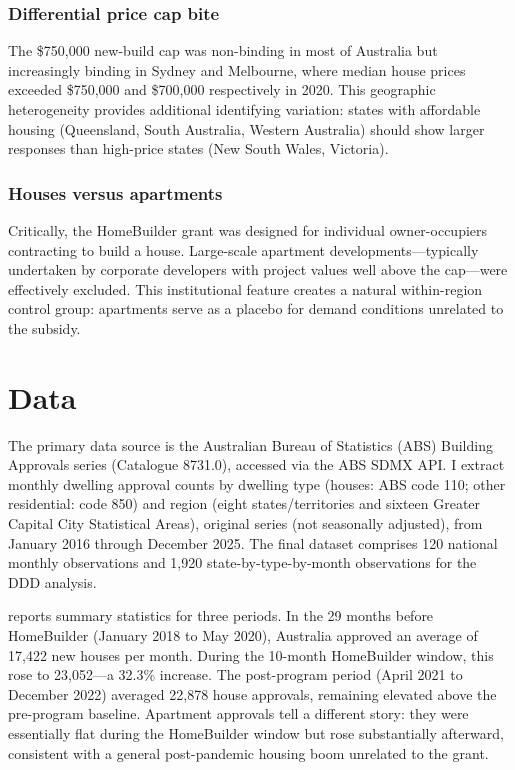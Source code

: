 \documentclass[12pt]{article}
\begin{document}
\subsubsection*{Differential price cap bite} The \$750,000 new-build cap was non-binding in most of Australia but increasingly binding in Sydney and Melbourne, where median house prices exceeded \$750,000 and \$700,000 respectively in 2020. This geographic heterogeneity provides additional identifying variation: states with affordable housing (Queensland, South Australia, Western Australia) should show larger responses than high-price states (New South Wales, Victoria).

\subsubsection*{Houses versus apartments} Critically, the HomeBuilder grant was designed for individual owner-occupiers contracting to build a house. Large-scale apartment developments---typically undertaken by corporate developers with project values well above the cap---were effectively excluded. This institutional feature creates a natural within-region control group: apartments serve as a placebo for demand conditions unrelated to the subsidy.


\section{Data}
\label{sec:data}

The primary data source is the Australian Bureau of Statistics (ABS) Building Approvals series (Catalogue 8731.0), accessed via the ABS SDMX API. I extract monthly dwelling approval counts by dwelling type (houses: ABS code 110; other residential: code 850) and region (eight states/territories and sixteen Greater Capital City Statistical Areas), original series (not seasonally adjusted), from January 2016 through December 2025. The final dataset comprises 120 national monthly observations and 1,920 state-by-type-by-month observations for the DDD analysis.



 reports summary statistics for three periods. In the 29 months before HomeBuilder (January 2018 to May 2020), Australia approved an average of 17,422 new houses per month. During the 10-month HomeBuilder window, this rose to 23,052---a 32.3\% increase. The post-program period (April 2021 to December 2022) averaged 22,878 house approvals, remaining elevated above the pre-program baseline. Apartment approvals tell a different story: they were essentially flat during the HomeBuilder window but rose substantially afterward, consistent with a general post-pandemic housing boom unrelated to the grant.
\end{document}
